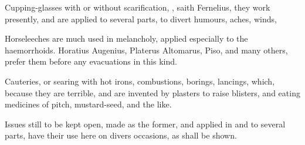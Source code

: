 {Cupping-glasses with or without scarification, , saith Fernelius, they work presently, and are applied to several parts, to divert humours, aches, winds, \etc{}

Horseleeches are much used in melancholy, applied especially to the haemorrhoids. Horatius Augenius,  Platerus  Altomarus, Piso, and many others, prefer them before any evacuations in this kind.

Cauteries, or searing with hot irons, combustions, borings, lancings, which, because they are terrible,  and  are invented by plasters to raise blisters, and eating medicines of pitch, mustard-seed, and the like.

Issues still to be kept open, made as the former, and applied in and to several parts, have their use here on divers occasions, as shall be shown.
}
